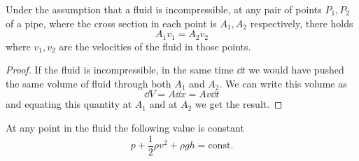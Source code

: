 \documentclass[12pt]{extarticle}
\begin{document}
\begin{theorem}
    \label{thm:continuity_equation}
    Under the assumption that a fluid is incompressible, at any pair of points $P_1, P_2$ of a pipe, where the cross section in each point is $A_1, A_2$ respectively, there holds
    \begin{equation}
        A_1 v_1 = A_2 v_2
    \end{equation}
    where $v_1, v_2$ are the velocities of the fluid in those points.
\end{theorem}

\begin{proof}
    If the fluid is incompressible, in the same time $\dd{t}$ we would have pushed the same volume of fluid through both $A_1$ and $A_2$.
    We can write this volume as
    \begin{equation}
        \dd{V} = A \dd{x} = A v \dd{t}
    \end{equation}
    and equating this quantity at $A_1$ and at $A_2$ we get the result.
\end{proof}

\begin{theorem}
    At any point in the fluid the following value is constant
    \begin{equation}
        p + \frac{1}{2} \rho v^2 + \rho g h = \mathrm{const.}
    \end{equation}
\end{theorem}
\end{document}
